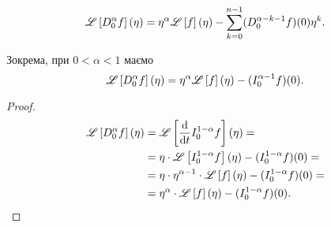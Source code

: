 \begin{lemma}
    \begin{equation}
        \mathscr{L}\left[D_0^{\alpha} f\right](\eta) = \eta^{\alpha} \mathscr{L}\left[f\right](\eta) - \sum_{k = 0}^{n - 1} (D_0^{\alpha - k - 1} f) (0) \eta^k.
    \end{equation}
\end{lemma}
\begin{example}
    Зокрема, при $0 < \alpha < 1$ маємо
    \begin{equation}
        \mathscr{L}\left[D_0^{\alpha} f\right](\eta) = \eta^{\alpha} \mathscr{L}\left[f\right](\eta) - (I_0^{\alpha - 1} f) (0).
    \end{equation}
\end{example}
\begin{proof}
    \begin{equation}
        \begin{aligned}
            \mathscr{L}\left[D_0^{\alpha} f\right](\eta) &= \mathscr{L}\left[\frac{\mathop{}\!\mathrm{d}}{\mathop{}\!\mathrm{d} t} I_0^{1 - \alpha} f\right](\eta) = \\
            &= \eta \cdot \mathscr{L}\left[I_0^{1 - \alpha} f\right](\eta) - (I_0^{1 - \alpha} f)(0) = \\
            &= \eta \cdot \eta^{\alpha - 1} \cdot \mathscr{L}\left[f\right](\eta) - (I_0^{1 - \alpha} f)(0) = \\
            &= \eta^\alpha \cdot \mathscr{L}\left[f\right](\eta) - (I_0^{1 - \alpha} f)(0).
        \end{aligned}
    \end{equation}
\end{proof}

